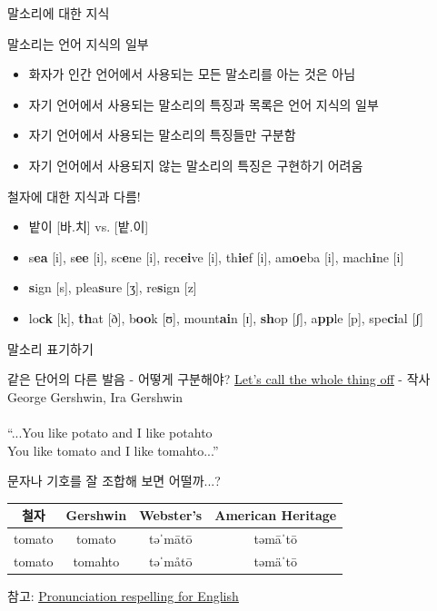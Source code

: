 \documentclass[11pt, aspectratio=169]{beamer}
\newcommand{\textds}[1]{{\ipafont #1}}
\begin{document}
\begin{frame}[t]{말소리에 대한 지식}
    \begin{block}{말소리는 언어 지식의 일부}
        \begin{itemize}
            \item 화자가 인간 언어에서 사용되는 모든 말소리를 아는 것은 아님
            \item 자기 언어에서 사용되는 말소리의 특징과 목록은 언어 지식의 일부
            \item 자기 언어에서 사용되는 말소리의 특징들만 구분함
            \item 자기 언어에서 사용되지 않는 말소리의 특징은 구현하기 어려움
        \end{itemize}
    \end{block}
    \begin{block}{철자에 대한 지식과 다름!}
        \begin{itemize}
            \item 밭이 [바.치] vs. [밭.이]
            \item s\textbf{ea} [\textds{i}], s\textbf{ee} [\textds{i}], sc\textbf{e}ne [\textds{i}], rec\textbf{ei}ve [\textds{i}], th\textbf{ie}f [\textds{i}], am\textbf{oe}ba [\textds{i}], mach\textbf{i}ne [\textds{i}]
            \item \textbf{s}ign [\textds{s}], plea\textbf{s}ure [\textds{ʒ}], re\textbf{s}ign [\textds{z}]
            \item lo\textbf{ck} [\textds{k}], \textbf{th}at [\textds{ð}], b\textbf{oo}k [\textds{ʊ}], mount\textbf{ai}n [\textds{ɪ}], \textbf{sh}op [\textds{ʃ}], a\textbf{pp}le [\textds{p}], spe\textbf{ci}al [\textds{ʃ}]
        \end{itemize}
    \end{block}
\end{frame}

\begin{frame}[t]{말소리 표기하기}
\begin{block}{같은 단어의 다른 발음 - 어떻게 구분해야?}
    \href{https://youtu.be/rBmETgzs5KY?t=36}{\underline{Let's call the whole thing off}} - 작사 George Gershwin, Ira Gershwin\\
    \\
    “...You like potato and I like potahto\\
    You like tomato and I like tomahto...”
    \end{block}
    \begin{block}{문자나 기호를 잘 조합해 보면 어떨까...?}
        \centering
        \begin{tabular}{c|c|c|c}
            철자 & Gershwin & Webster’s & American Heritage \\
            \hline
            tomato & tomato & \textds{təˈmātō} & \textds{təmāˈtō} \\
            \hline
            tomato & tomahto & \textds{təˈmåtō} & \textds{təmäˈtō}
        \end{tabular}
    \end{block}
    참고: \href{https://en.wikipedia.org/wiki/Pronunciation_respelling_for_English}{\underline{Pronunciation respelling for English}}
\end{frame}
\end{document}
